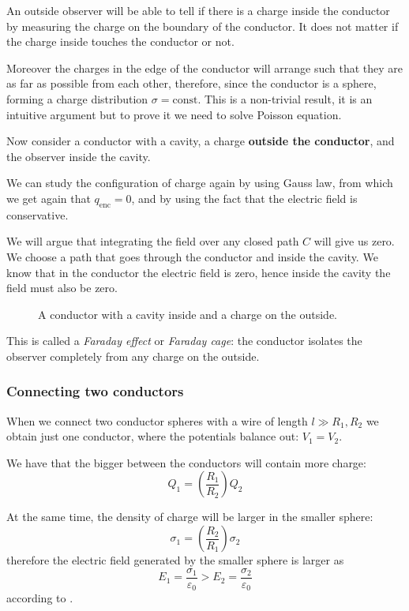 \documentclass[12pt]{extarticle}
\begin{document}
An outside observer will be able to tell if there is a charge inside the conductor by measuring the charge on the boundary of the conductor.
It does not matter if the charge inside touches the conductor or not.

Moreover the charges in the edge of the conductor will arrange such that they are as far as possible from each other, therefore, since the conductor is a sphere, forming a charge distribution $\sigma = \text{const}$.
This is a non-trivial result, it is an intuitive argument but to prove it we need to solve Poisson equation.

Now consider a conductor with a cavity, a charge \textbf{outside the conductor}, and the observer inside the cavity.

We can study the configuration of charge again by using Gauss law, from which we get again that $q_\text{enc} = 0$, and by using the fact that the electric field is conservative.

We will argue that integrating the field over any closed path $C$ will give us zero.
We choose a path that goes through the conductor and inside the cavity.
We know that in the conductor the electric field is zero, hence inside the cavity the field must also be zero.

\begin{figure}[H]
    \centering
    
    \caption{A conductor with a cavity inside and a charge on the outside.}
\end{figure}

This is called a \emph{Faraday effect} or \emph{Faraday cage}: the conductor isolates the observer completely from any charge on the outside.


\subsubsection{Connecting two conductors}

When we connect two conductor spheres with a wire of length $l \gg R_1, R_2$ we obtain just one conductor, where the potentials balance out: $V_1 = V_2$.

We have that the bigger between the conductors will contain more charge:
\begin{equation}
    Q_1 = \left(\frac{R_1}{R_2}\right) Q_2
\end{equation}

At the same time, the density of charge will be larger in the smaller sphere:
\begin{equation}
    \sigma_1 =  \left(\frac{R_2}{R_1}\right) \sigma_2
\end{equation}
therefore the electric field generated by the smaller sphere is larger as
\begin{equation}
    E_1 = \frac{\sigma_1}{\varepsilon_0} > E_2 = \frac{\sigma_2}{\varepsilon_0}
\end{equation}
according to .
\end{document}
